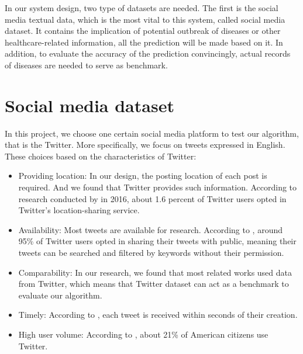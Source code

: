 In our system design, two type of datasets are needed. The first is the social media textual data, which is the most vital to this system, called social media dataset. It contains the implication of potential outbreak of diseases or other healthcare-related information, all the prediction will be made based on it. In addition, to evaluate the accuracy of the prediction convincingly, actual records of diseases are needed to serve as benchmark. 
\section{Social media dataset}
\label{sec:Social media dataset}
In this project, we choose one certain social media platform to test our algorithm, that is the Twitter. More specifically, we focus on tweets expressed in English. These choices based on the characteristics of Twitter:
\begin{itemize}
    \item Providing location: In our design, the posting location of each post is required. And we found that Twitter provides such information. According to research conducted by \cite{greenwood2016social} in 2016, about 1.6 percent of Twitter users opted in Twitter's location-sharing service.
    \item Availability: Most tweets are available for research. According to \cite{serban2019real}, around 95\% of Twitter users opted in sharing their tweets with public, meaning their tweets can be searched and filtered by keywords without their permission.  
    \item Comparability: In our research, we found that most related works used data from Twitter, which means that Twitter dataset can act as a benchmark to evaluate our algorithm.
    \item Timely: According to \cite{serban2019real}, each tweet is received within seconds of their creation.
    \item High user volume: According to \cite{greenwood2016social}, about 21\% of American citizens use Twitter.
\end{itemize} 

